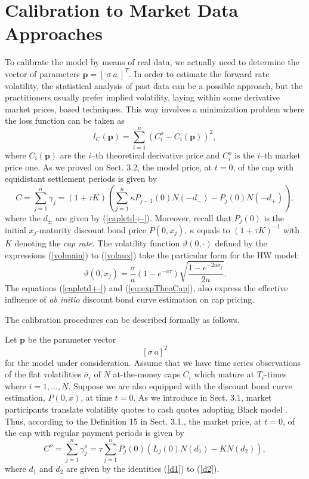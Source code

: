 \section{Calibration to Market Data Approaches}
To calibrate the model by means of real data, we actually need to
determine the vector of parameters $\boldsymbol
p=[\:\sigma\:a\:]^T$. In order to estimate the forward rate
volatility,  the statistical analysis of past data can be a possible
approach, but the practitioners usually prefer implied volatility,
laying within some derivative market prices, based techniques. This
way involves a minimization problem where  the loss function can be
taken as  
$$
l_C(\boldsymbol p)=\sum^n_{i=1}(C^o_i- C_i(\boldsymbol p))^2,
$$
where $ C_i(\boldsymbol p)$ are the $i$--th theoretical derivative price and
$C^o_i$ is the $i$--th market price one. As we proved on Sect. 3.2,
the model price, at $t=0$, of the cap with equidistant 
settlement periods is given by 
\begin{equation}
\label{eq:expTheoCap}
C=\sum_{j=1}^n \gamma_j = (1+\tau K) \left(\sum_{j=1}^n \kappa
  P_{j-1}(0)N(-d_-)-P_j(0)N(-d_+)\right),
\end{equation} 
where the $d_{\pm}$ are given by (\ref{capletd+-}). 
Moreover, recall that $P_j(0)$ is the initial $x_j$-maturity discount
bond price $P(0,x_j)$, $\kappa$ equals to $(1+\tau K)^{-1}$ with $K$
denoting the {\sl cap rate}. The volatility function
$\vartheta(0,\cdot)$ defined by the expressions (\ref{volmain}) to
(\ref{volaux}) take the particular form for the HW model:
$$ 
\vartheta(0,x_j)=\frac{\sigma}{a}\left( 1-e^{-a \tau} \right)
\sqrt{\frac{1-e^{-2 a x_j}}{2 a}}. 
$$
The equations (\ref{capletd+-}) and (\ref{eq:expTheoCap}), also
express the effective influence of {\sl ab initio} discount bond curve
estimation on cap pricing.%

The calibration procedures can be described formally as follows. 

Let $\boldsymbol p$ be the parameter vector 
$$[\sigma\:a]^T$$ 
for the model under consideration. Assume that we have time series
observations of the flat volatilities $\bar\sigma_i$ of $N$
at-the-money caps $C_i$ which mature at $T_i$-times where
$i=1,\dots,N$. Suppose we are also equipped with the discount bond
curve estimation, $P(0,x)$, at time $t=0$. As we introduce in
Sect. 3.1, market participants translate volatility quotes to cash
quotes adopting Black model \cite{B:1976}. Thus, according to the
Definition 15 in Sect. 3.1., the market price, at $t=0$, of the cap
with regular payment periods is given by
\begin{equation}
\label{eq:expMktCap}
C^o=\sum_{j=1}^n \gamma^o_j = \tau \sum_{j=1}^n P_j(0)\left(L_j(0)
  N(d_1)-K N(d_2)\right),
\end{equation}  where $d_1$ and $d_2$ are given by the identities
(\ref{d1}) to (\ref{d2}). 

